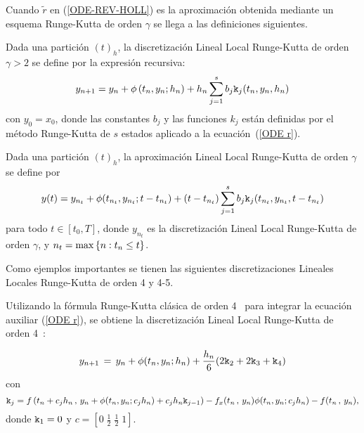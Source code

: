 Cuando $\widetilde{r}$ en (\ref{ODE-REV-HOLL})  es la aproximación obtenida mediante un esquema Runge-Kutta de orden $\gamma$ se llega a las definiciones siguientes.
\begin{definition}
	\label{definition HLLD} \cite{Jimenez13} Dada una partición $(t)_{h}$, la discretización Lineal Local Runge-Kutta 
    de orden $\gamma >2$ se define por la expresión recursiva:
	\begin{equation*}
	y_{n+1}=y_{n}+\phi \left( t_{n},y_{n};h_{n}\right) +h_{n}\sum_{j=1}^{s}b_{j}\mathtt{k}_{j}(t_n,y_n,h_n)
	\end{equation*}%
	con $y_{0}=x_{0}$, donde las constantes $b_{j}$ y las funciones $k_{j}$ están definidas por el método Runge-Kutta de $s$ estados aplicado a la ecuación~(\ref{ODE r}).
\end{definition}
\begin{definition}
	\label{definition HOLLA} \cite{Jimenez13} Dada una partición $(t)_{h}$, la aproximación Lineal Local Runge-Kutta de orden $\gamma$ se define por 
	\begin{equation*}
	y(t)=y_{n_{t}}+\phi(t_{n_{t}},y_{n_{t}};t-t_{n_{t}})+(t-t_{n_{t}})%
	\sum_{j=1}^{s}b_{j}\kt_{j}(t_{n_{t}},y_{n_{t}},t-t_{n_{t}}) %
	\end{equation*}
	para todo $t\in[t_{0},T]$, donde $y_{n_{t}}$ es la discretización Lineal Local Runge-Kutta de orden $\gamma$, y $n_{t}=\max\left\{ n:t_{n}\leq t \right\}$.
\end{definition}

Como ejemplos importantes se tienen las siguientes discretizaciones Lineales Locales Runge-Kutta de orden 4 y 4-5.

Utilizando la fórmula Runge-Kutta clásica de orden 4~\cite{hairer1993solving} para integrar la ecuación auxiliar (\ref{ODE r}), se obtiene la discretización Lineal Local Runge-Kutta de orden 4~\cite{Jimenez13}:

\begin{equation}
    y_{n+1}\,=\,y_n+\phi(t_n,y_n;h_n)+\frac{h_n}{6}(2\mathtt{k}_2+2\mathtt{k}_3+\mathtt{k}_4)
    \label{LL-scheme-4}
\end{equation}
con
    \[ \mathtt{k}_j = f\left( t_n+c_jh_n\, , \, y_n+\phi(t_n,y_n;c_jh_n)+c_jh_n\mathtt{k}_{j-1} \right)
- f_x(t_n\, , \, y_n)\phi(t_n,y_n;c_jh_n) - f(t_n\, ,\, y_n) ,\]
donde $\mathtt{k}_1=0$ y $c = \left[ 0 \; \frac{1}{2} \; \frac{1}{2} \; 1  \right]$.


